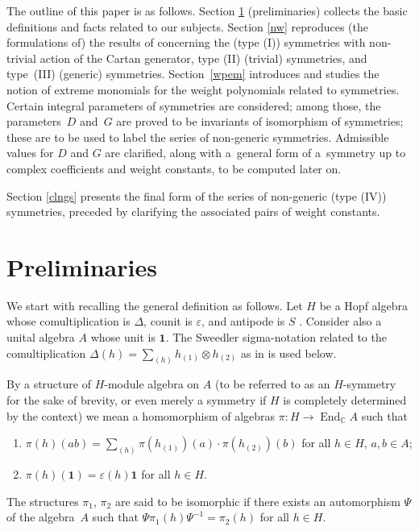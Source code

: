 \documentclass[10pt,a4paper]{amsart}
\numberwithin{equation}{section}
\begin{document}
The outline of this paper is as follows. Section \ref{prel} (preliminaries) collects the basic definitions and facts related to our subjects. Section \ref{nw} reproduces (the formulations of) the results of \cite{S} concerning the (type (I)) symmetries with non-trivial action of the Cartan generator, type (II) (trivial) symmetries, and type~(III) (generic) symmetries. Section~\ref{wpem} introduces and studies the notion of extreme monomials for the weight polynomials related to symmetries. Certain integral parameters of symmetries are considered; among those, the parameters~$D$ and~$G$ are proved to be invariants of isomorphism of symmetries; these are to be used to label the series of non-generic symmetries. Admissible values for $D$ and $G$ are clarified, along with a~general form of a~symmetry up to complex coefficients and weight constants, to be computed later on.

Section \ref{clngs} presents the final form of the series of non-generic (type (IV)) symmetries, preceded by clarifying the associated pairs of weight constants.

\section{Preliminaries}\label{prel}

We start with recalling the general definition as follows. Let $H$ be a Hopf algebra whose comultiplication is $\Delta$, counit is $\varepsilon$, and antipode is $S$ \cite{abe}. Consider also a unital algebra $A$ whose unit is $\mathbf{1}$. The Sweedler sigma-notation related to the comultiplication $\Delta(h)=\sum\limits_{(h)}h_{(1)}\otimes h_{(2)}$ as in \cite{sweedler} is used below.

\begin{Definition}\label{symdef}
By a structure of $H$-module algebra on $A$ (to be referred to as an $H$-symmetry for the sake of brevity, or even merely a symmetry if $H$ is completely determined by the context) we mean a homomorphism of algebras $\pi\colon H\to\operatorname{End}_\mathbb{C}A$ such that
\begin{enumerate}\itemsep=0pt\samepage
\item[(i)] $\pi(h)(ab)=\sum\limits_{(h)}\pi(h_{(1)})(a)\cdot\pi(h_{(2)})(b)$ for all $h\in H$, $a,b\in A$;
\item[(ii)] $\pi(h)(\mathbf{1})=\varepsilon(h)\mathbf{1}$ for all $h\in H$.
\end{enumerate}
The structures $\pi_1$, $\pi_2$ are said to be isomorphic if there exists an automorphism $\Psi$ of the algebra~$A$ such that $\Psi\pi_1(h)\Psi^{-1}=\pi_2(h)$ for all $h\in H$.
\end{Definition}
\end{document}
